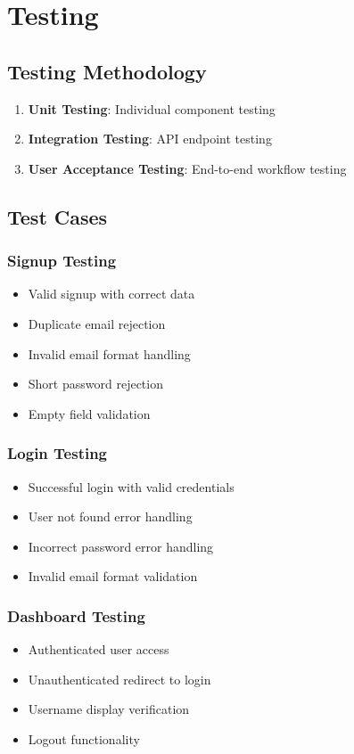 \documentclass[12pt,a4paper]{article}
\begin{document}
\section{Testing}

\subsection{Testing Methodology}
\begin{enumerate}
    \item \textbf{Unit Testing}: Individual component testing
    \item \textbf{Integration Testing}: API endpoint testing
    \item \textbf{User Acceptance Testing}: End-to-end workflow testing
\end{enumerate}

\subsection{Test Cases}

\subsubsection{Signup Testing}
\begin{itemize}
    \item Valid signup with correct data
    \item Duplicate email rejection
    \item Invalid email format handling
    \item Short password rejection
    \item Empty field validation
\end{itemize}

\subsubsection{Login Testing}
\begin{itemize}
    \item Successful login with valid credentials
    \item User not found error handling
    \item Incorrect password error handling
    \item Invalid email format validation
\end{itemize}

\subsubsection{Dashboard Testing}
\begin{itemize}
    \item Authenticated user access
    \item Unauthenticated redirect to login
    \item Username display verification
    \item Logout functionality
\end{itemize}
\end{document}
